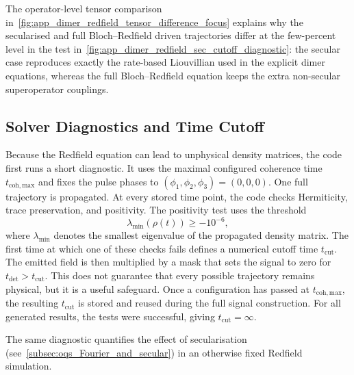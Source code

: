 The operator-level tensor comparison
in~\autoref{fig:app_dimer_redfield_tensor_difference_focus} explains why the
secularised and full Bloch--Redfield driven trajectories differ at the
few-percent level in the test
in~\autoref{fig:app_dimer_redfield_sec_cutoff_diagnostic}: the secular case
reproduces exactly the rate-based Liouvillian used in the explicit dimer
equations, whereas the full Bloch--Redfield equation keeps the extra
non-secular superoperator couplings.


\subsection{Solver Diagnostics and Time Cutoff}

Because the Redfield equation can lead to unphysical density matrices, the code first runs a short diagnostic. It uses the maximal configured coherence time \(t_{\mathrm{coh,max}}\) and fixes the pulse phases to \((\phi_1,\phi_2,\phi_3)=(0,0,0)\). One full trajectory is propagated. At every stored time point, the code checks Hermiticity, trace preservation, and positivity. The positivity test uses the threshold
\begin{equation*}
\lambda_{\min}(\rho(t)) \ge -10^{-6},
\end{equation*}
where \(\lambda_{\min}\) denotes the smallest eigenvalue of the propagated density matrix. The first time at which one of these checks fails defines a numerical cutoff time \(t_{\mathrm{cut}}\). The emitted field is then multiplied by a mask that sets the signal to zero for \(t_{\mathrm{det}} > t_{\mathrm{cut}}\). This does not guarantee that every possible trajectory remains physical, but it is a useful safeguard.
Once a configuration has passed at \(t_{\mathrm{coh,max}}\), the resulting \(t_{\mathrm{cut}}\) is stored and reused during the full signal construction. For all generated results, the tests were successful, giving \(t_{\mathrm{cut}}=\infty\).

The same diagnostic quantifies the effect of secularisation
(see~\autoref{subsec:oqs_Fourier_and_secular}) in an otherwise fixed Redfield
simulation.

